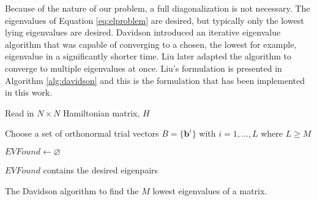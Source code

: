 \documentclass[final,3p,times,twocolumn]{elsarticle}
\begin{document}
Because of the nature of our problem, a full diagonalization is not necessary. The eigenvalues of Equation \eqref{eq:elproblem} are desired, but typically only the lowest lying eigenvalues are desired. Davidson introduced an iterative eigenvalue algorithm that was capable of converging to a chosen, the lowest for example, eigenvalue in a significantly shorter time.\cite{davidson} Liu later adapted the algorithm to converge to multiple eigenvalues at once.\cite{liu} Liu's formulation is presented in Algorithm \ref{alg:davidson} and this is the formulation that has been implemented in this work.

\begin{algorithm}
 Read in $N \times N$ Hamiltonian matrix, $H$\;
 
 Choose a set of orthonormal trial vectors $B = \{\mathbf{b}^i\}$ with $i = 1,  \ldots, L$ where $L \geq M$\;
 
 $EVFound \leftarrow \varnothing $\;
 
 $EVFound$ contains the desired eigenpairs\;

\caption{The Davidson algorithm to find the $M$ lowest eigenvalues of a matrix.} 
\label{alg:davidson}
\end{algorithm}
\end{document}

